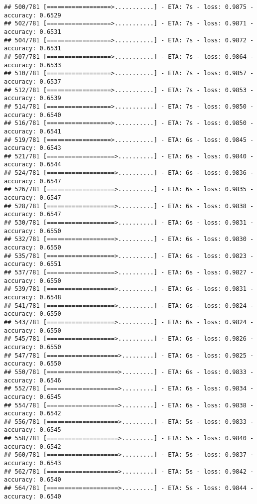 \documentclass[
]{article}
\begin{document}
\begin{verbatim}
## 500/781 [==================>...........] - ETA: 7s - loss: 0.9875 - accuracy: 0.6529
## 502/781 [==================>...........] - ETA: 7s - loss: 0.9871 - accuracy: 0.6531
## 504/781 [==================>...........] - ETA: 7s - loss: 0.9872 - accuracy: 0.6531
## 507/781 [==================>...........] - ETA: 7s - loss: 0.9864 - accuracy: 0.6533
## 510/781 [==================>...........] - ETA: 7s - loss: 0.9857 - accuracy: 0.6537
## 512/781 [==================>...........] - ETA: 7s - loss: 0.9853 - accuracy: 0.6539
## 514/781 [==================>...........] - ETA: 7s - loss: 0.9850 - accuracy: 0.6540
## 516/781 [==================>...........] - ETA: 7s - loss: 0.9850 - accuracy: 0.6541
## 519/781 [==================>...........] - ETA: 6s - loss: 0.9845 - accuracy: 0.6543
## 521/781 [===================>..........] - ETA: 6s - loss: 0.9840 - accuracy: 0.6544
## 524/781 [===================>..........] - ETA: 6s - loss: 0.9836 - accuracy: 0.6547
## 526/781 [===================>..........] - ETA: 6s - loss: 0.9835 - accuracy: 0.6547
## 528/781 [===================>..........] - ETA: 6s - loss: 0.9838 - accuracy: 0.6547
## 530/781 [===================>..........] - ETA: 6s - loss: 0.9831 - accuracy: 0.6550
## 532/781 [===================>..........] - ETA: 6s - loss: 0.9830 - accuracy: 0.6550
## 535/781 [===================>..........] - ETA: 6s - loss: 0.9823 - accuracy: 0.6551
## 537/781 [===================>..........] - ETA: 6s - loss: 0.9827 - accuracy: 0.6550
## 539/781 [===================>..........] - ETA: 6s - loss: 0.9831 - accuracy: 0.6548
## 541/781 [===================>..........] - ETA: 6s - loss: 0.9824 - accuracy: 0.6550
## 543/781 [===================>..........] - ETA: 6s - loss: 0.9824 - accuracy: 0.6550
## 545/781 [===================>..........] - ETA: 6s - loss: 0.9826 - accuracy: 0.6550
## 547/781 [====================>.........] - ETA: 6s - loss: 0.9825 - accuracy: 0.6550
## 550/781 [====================>.........] - ETA: 6s - loss: 0.9833 - accuracy: 0.6546
## 552/781 [====================>.........] - ETA: 6s - loss: 0.9834 - accuracy: 0.6545
## 554/781 [====================>.........] - ETA: 6s - loss: 0.9838 - accuracy: 0.6542
## 556/781 [====================>.........] - ETA: 5s - loss: 0.9833 - accuracy: 0.6545
## 558/781 [====================>.........] - ETA: 5s - loss: 0.9840 - accuracy: 0.6542
## 560/781 [====================>.........] - ETA: 5s - loss: 0.9837 - accuracy: 0.6543
## 562/781 [====================>.........] - ETA: 5s - loss: 0.9842 - accuracy: 0.6540
## 564/781 [====================>.........] - ETA: 5s - loss: 0.9844 - accuracy: 0.6540

\end{verbatim}
\end{document}
